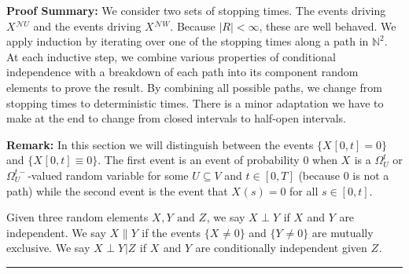 \documentclass[12pt]{article}
\newcommand{\skipLine}{\vspace{12pt}}
\newcommand{\mb}{\mathbb}
\newcommand{\mc}{\mathcal}
\newcommand{\te}{\text}
\newcommand{\pfsum}{\textbf{Proof Summary: }}
\newcommand{\ind}{\hspace{24pt}}
\newcommand{\lin}{\rule{\linewidth}{0.4 pt}}
\newcommand{\neigh}{\mc{N}}					%
\renewcommand{\U}{U}							%
\newcommand{\UU}{W}								%
\newcommand{\UUU}{R}							%
\newcommand{\T}{T}								%
\newcommand{\OmegaV}[2]{\Omega_{#1}^{#2}}		%
\renewcommand{\t}{t}							%
\newcommand{\V}{V}									%
\renewcommand{\tt}{s}								%
\newcommand{\rxvt}[2]{X_{#1}{(#2)}}					%
\newcommand{\rxvts}[2]{X_{#1}{#2}}					%
\newcommand{\rxvtts}[2]{Y_{#1}{#2}}					%
\newcommand{\rxvttts}[2]{Z_{#1}{#2}}				%
\newcommand{\mutex}{\|}								%
\begin{document}
\pfsum We consider two sets of stopping times. The events driving \(\rxvts{}{}^{\neigh{\U}}\) and the events driving \(\rxvts{}{}^{\neigh{\UU}}\). Because \(|\UUU| < \infty\), these are well behaved. We apply induction by iterating over one of the stopping times along a path in \(\mb{N}^2\). At each inductive step, we combine various properties of conditional independence with a breakdown of each path into its component random elements to prove the result. By combining all possible paths, we change from stopping times to deterministic times. There is a minor adaptation we have to make at the end to change from closed intervals to half-open intervals.

\skipLine

\textbf{Remark:} In this section we will distinguish between the events \(\{\rxvts{}{[0,\t]} = 0\}\) and \(\{\rxvts{}{[0,\t]}\equiv 0\}\). The first event is an event of probability 0 when \(\rxvts{}{}\) is a \(\OmegaV{\U}{\t}\) or \(\OmegaV{\U}{\t-}\)-valued random variable for some \(\U\subseteq \V\) and \(\t \in [0,\T]\) (because 0 is not a path) while the second event is the event that \(\rxvt{}{\tt} = 0\) for all \(\tt \in [0,\t]\).

\ind Given three random elements \(\rxvts{}{},\rxvtts{}{} \te{ and } \rxvttts{}{}\), we say \(\rxvts{}{}\perp \rxvtts{}{}\) if \(\rxvts{}{}\) and \(\rxvtts{}{}\) are independent. We say \(\rxvts{}{}\mutex \rxvtts{}{}\) if the events \(\{\rxvts{}{}\neq 0\}\) and \(\{\rxvtts{}{} \neq 0\}\) are mutually exclusive. We say \(\rxvts{}{}\perp \rxvtts{}{}|\rxvttts{}{}\) if \(\rxvts{}{}\) and \(\rxvtts{}{}\) are conditionally independent given \(\rxvttts{}{}\).

\lin
\end{document}
